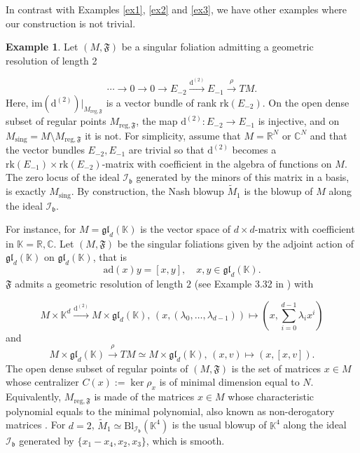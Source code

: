 \documentclass[10pt]{article}
\theoremstyle{plain}
\theoremstyle{definition}
\newtheorem{example}[lemma]{Example}
\theoremstyle{remark}
\newcommand{\dd}{\mathrm{d}}
\begin{document}
 In  contrast with Examples  \ref{ex1}, \ref{ex2} and \ref{ex3}, we have other  examples  where our construction is not trivial.

 \begin{example}Let $(M,\mathfrak F)$ be a singular foliation admitting a geometric resolution of length 2

$$\cdots \longrightarrow 0\longrightarrow 0\longrightarrow E_{-2}\stackrel{\dd^{(2)}}{\longrightarrow}E_{-1}\stackrel{\rho}{\longrightarrow}TM.$$ Here, $\mathrm{im}(\dd^{(2)})|_{M_{\mathrm{reg},\mathfrak F}}$ is a vector bundle of rank $\mathrm{rk}(E_{-2})$. On the open dense subset of regular points $M_{\mathrm{reg},\mathfrak F}$, the map  $\dd^{(2)}\colon E_{-2}\to E_{-1}$ is injective, and on $M_{\mathrm{sing}}=M\setminus M_{\mathrm{reg},\mathfrak F}$ it is not. For simplicity, assume that $M=\mathbb R^N$ or $\mathbb C^N$ and that the vector bundles $E_{-2}, E_{-1}$ are trivial so that $\dd^{(2)}$ becomes a $\mathrm{rk}(E_{-1})\times \mathrm{rk}(E_{-2})$-matrix with coefficient in the algebra of functions on $M$. %
The zero locus of the ideal $\mathcal{I}_\mathfrak b$ generated by the minors of this matrix in a basis, is exactly $M_{\mathrm{sing}}$. By construction, the Nash blowup $\widetilde M_1$ is the blowup of $M$ along the ideal $\mathcal{I}_\mathfrak b$.

For instance, for $M=\mathfrak{gl}_d(\mathbb K)$ is the vector space of $d\times d$-matrix with coefficient in $\mathbb K=\mathbb R, \mathbb C$. Let $(M,\mathfrak F)$ be the singular foliations given by  the adjoint action of $\mathfrak{gl}_d(\mathbb K)$ on $\mathfrak{gl}_d(\mathbb K)$, that is 
$$
\mathrm{ad}(x)y=[x, y], \quad x, y\in \mathfrak{gl}_d(\mathbb K).
$$$\mathfrak F$ admits a geometric resolution of length $2$ (see Example 3.32 in \cite{LLS}) with

$$M\times \mathbb K^d\stackrel{\dd^{(2)}}{\longrightarrow} M\times \mathfrak{gl}_d(\mathbb K),\, (x, (\lambda_0,\ldots, \lambda_{d-1}))\mapsto (x, \sum_{i=0}^{d-1}\lambda_ix^i)$$
    and $$M\times \mathfrak{gl}_d(\mathbb K)\stackrel{\rho}{\longrightarrow}TM\simeq M\times\mathfrak{gl}_d(\mathbb K) ,\, (x, v)\mapsto (x, [x, v]).$$ The open dense subset of regular points of $(M,\mathfrak F)$ is the set of matrices $x\in M$ whose centralizer $C(x):=\ker\rho_x$ is of minimal dimension equal to $N$. Equivalently, $M_{\mathrm{reg},\mathfrak F}$ is made of the matrices $x\in M$ whose characteristic polynomial 
equals to the minimal polynomial, also known as non-derogatory matrices \cite{wang2019explicitdescriptioncentralizersmatrix}. For $d=2$, $\widetilde M_1\simeq\mathrm{Bl}_{\mathcal{I}_\mathfrak b}(\mathbb K^4)$ is the usual blowup of $\mathbb K^4$ along the ideal $\mathcal I_\mathfrak b$ generated  by $\{x_1-x_4, x_2, x_3\}$, which is smooth.


\end{example}
\end{document}
